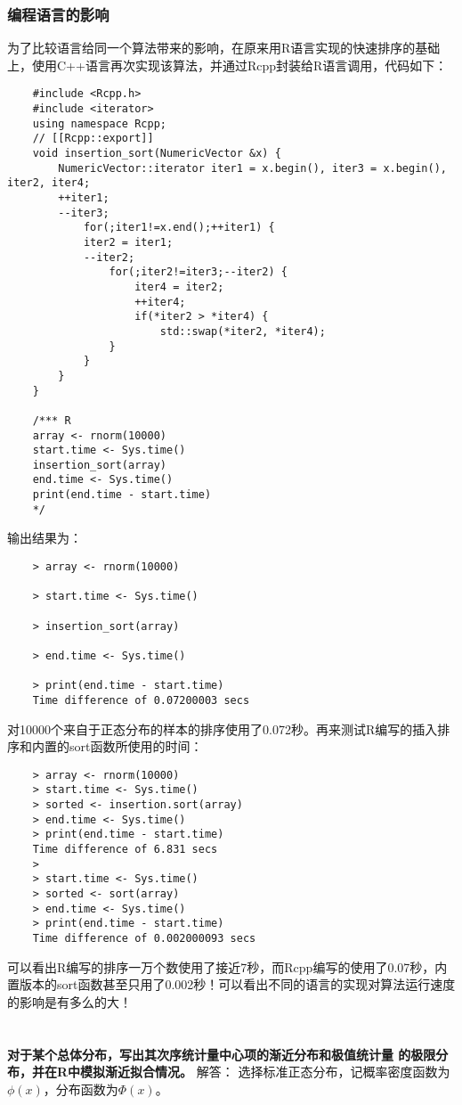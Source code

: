 \documentclass[UTF8]{article}
\begin{document}
	\subsubsection{编程语言的影响}
	为了比较语言给同一个算法带来的影响，在原来用R语言实现的快速排序的基础上，使用C++语言再次实现该算法，并通过Rcpp封装给R语言调用，代码如下：
	\begin{lstlisting}
	#include <Rcpp.h>
	#include <iterator>
	using namespace Rcpp;
	// [[Rcpp::export]]
	void insertion_sort(NumericVector &x) {
		NumericVector::iterator iter1 = x.begin(), iter3 = x.begin(), iter2, iter4;
		++iter1;
		--iter3;
			for(;iter1!=x.end();++iter1) {
			iter2 = iter1;
			--iter2;
				for(;iter2!=iter3;--iter2) {
					iter4 = iter2;
					++iter4;
					if(*iter2 > *iter4) {
						std::swap(*iter2, *iter4);
				}
			}
		}
	}
	
	/*** R
	array <- rnorm(10000)
	start.time <- Sys.time()
	insertion_sort(array)
	end.time <- Sys.time()
	print(end.time - start.time)
	*/
	\end{lstlisting}
	输出结果为：
	\begin{lstlisting}
	> array <- rnorm(10000)
	
	> start.time <- Sys.time()
	
	> insertion_sort(array)
	
	> end.time <- Sys.time()
	
	> print(end.time - start.time)
	Time difference of 0.07200003 secs
	\end{lstlisting}
	对10000个来自于正态分布的样本的排序使用了0.072秒。再来测试R编写的插入排序和内置的sort函数所使用的时间：
	\begin{lstlisting}
	> array <- rnorm(10000)
	> start.time <- Sys.time()
	> sorted <- insertion.sort(array)
	> end.time <- Sys.time()
	> print(end.time - start.time)
	Time difference of 6.831 secs
	> 
	> start.time <- Sys.time()
	> sorted <- sort(array)
	> end.time <- Sys.time()
	> print(end.time - start.time)
	Time difference of 0.002000093 secs
	\end{lstlisting}
	可以看出R编写的排序一万个数使用了接近7秒，而Rcpp编写的使用了0.07秒，内置版本的sort函数甚至只用了0.002秒！可以看出不同的语言的实现对算法运行速度的影响是有多么的大！

	\section{}
	\textbf{对于某个总体分布，写出其次序统计量中心项的渐近分布和极值统计量
		的极限分布，并在R中模拟渐近拟合情况。}
	\bigbreak
	解答：
	选择标准正态分布，记概率密度函数为$\phi(x)$，分布函数为$\Phi(x)$。
\end{document}
